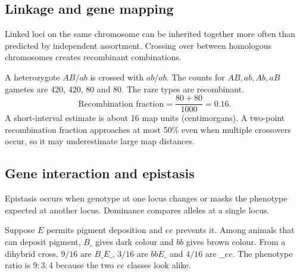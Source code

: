\documentclass[12pt,a4paper]{article}
\begin{document}
\subsection{Linkage and gene mapping}
Linked loci on the same chromosome can be inherited together more often than predicted by independent assortment. Crossing over between homologous chromosomes creates recombinant combinations.
\begin{tcolorbox}[examplebox, title={Map two loci using a testcross}]
A heterozygote $AB/ab$ is crossed with $ab/ab$. The counts for $AB,ab,Ab,aB$ gametes are 420, 420, 80 and 80. The rare types are recombinant.
\[
\text{Recombination fraction}=\frac{80+80}{1000}=0.16.
\]
A short-interval estimate is about 16 map units (centimorgans). A two-point recombination fraction approaches at most 50\% even when multiple crossovers occur, so it may underestimate large map distances.
\end{tcolorbox}

\subsection{Gene interaction and epistasis}
\begin{tcolorbox}[defbox, title={Epistasis}]
Epistasis occurs when genotype at one locus changes or masks the phenotype expected at another locus. Dominance compares alleles at a single locus.
\end{tcolorbox}

\begin{tcolorbox}[examplebox, title={How recessive epistasis changes a ratio}]
Suppose $E$ permits pigment deposition and $ee$ prevents it. Among animals that can deposit pigment, $B\_$ gives dark colour and $bb$ gives brown colour. From a dihybrid cross, $9/16$ are $B\_E\_$, $3/16$ are $bbE\_$ and $4/16$ are $\_\_ee$. The phenotype ratio is $9:3:4$ because the two $ee$ classes look alike.
\end{tcolorbox}
\end{document}
